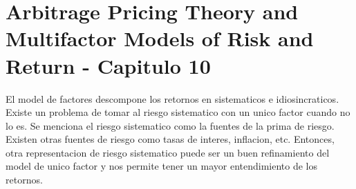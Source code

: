 \documentclass{article}
\begin{document}
\section{Arbitrage Pricing Theory and Multifactor Models of Risk and Return - Capitulo 10}
El model de factores descompone los retornos en sistematicos e idiosincraticos. Existe un problema de tomar
al riesgo sistematico con un unico factor cuando no lo es. Se menciona el riesgo sistematico como la fuentes de
 la prima de riesgo. Existen otras fuentes de riesgo como tasas de interes, inflacion, etc. Entonces, otra representacion de 
 riesgo sistematico puede ser un buen refinamiento del model de unico factor y nos permite tener un mayor entendimiento de los retornos.
\end{document}
